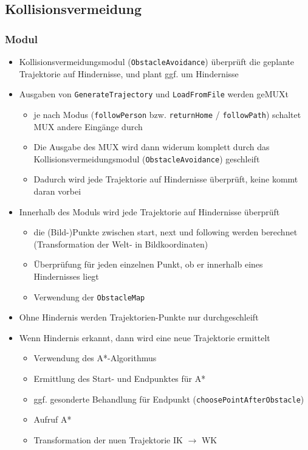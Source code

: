 \subsection{Kollisionsvermeidung}
\label{kollisionsvermeidung_subsec}

\subsubsection{Modul}
\authorsection{\editortobias}

\begin{itemize}
 
  \item Kollisionsvermeidungsmodul (\lstinline{ObstacleAvoidance}) überprüft die geplante Trajektorie auf Hindernisse, und plant ggf. um Hindernisse
  \item Ausgaben von \lstinline{GenerateTrajectory} und \lstinline{LoadFromFile} werden geMUXt
  \begin{itemize}
    \item je nach Modus (\lstinline{followPerson} bzw. \lstinline{returnHome} / \lstinline{followPath}) schaltet MUX andere Eingänge durch
  	\item Die Ausgabe des MUX wird dann widerum komplett durch das Kollisionsvermeidungsmodul (\lstinline{ObstacleAvoidance}) geschleift
    \item Dadurch wird jede Trajektorie auf Hindernisse überprüft, keine kommt \glqq daran vorbei\grqq
  \end{itemize}
  \item Innerhalb des Moduls wird jede Trajektorie auf Hindernisse überprüft
	\begin{itemize}
	  \item die (Bild-)Punkte zwischen start, next und following werden berechnet (Transformation der Welt- in Bildkoordinaten)
	  \item Überprüfung für jeden einzelnen Punkt, ob er innerhalb eines Hindernisses liegt
	  \item Verwendung der \lstinline{ObstacleMap} 
	\end{itemize}
  \item Ohne Hindernis werden Trajektorien-Punkte nur durchgeschleift
  \item Wenn Hindernis erkannt, dann wird eine neue Trajektorie ermittelt
  \begin{itemize}
    \item Verwendung des A*-Algorithmus
    \item Ermittlung des Start- und Endpunktes für A*
    \item ggf. gesonderte Behandlung für Endpunkt (\lstinline{choosePointAfterObstacle})
    \item Aufruf A*
    \item Transformation der nuen Trajektorie IK $\rightarrow$ WK
  \end{itemize}

\end{itemize}


